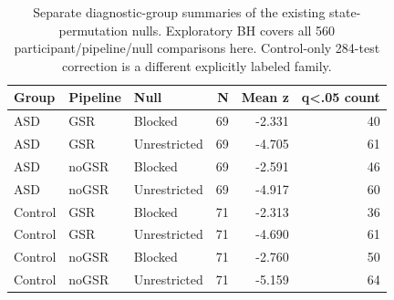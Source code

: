 \begin{table}[htbp]
\centering\small
\caption{Separate diagnostic-group summaries of the existing state-permutation nulls. Exploratory BH covers all 560 participant/pipeline/null comparisons here. Control-only 284-test correction is a different explicitly labeled family.}\label{tab:Sbothnull}
\begin{tabular}{lllrrr}
\toprule
Group & Pipeline & Null & N & Mean z & q<.05 count \\
\midrule
ASD & GSR & Blocked & 69 & -2.331 & 40 \\
ASD & GSR & Unrestricted & 69 & -4.705 & 61 \\
ASD & noGSR & Blocked & 69 & -2.591 & 46 \\
ASD & noGSR & Unrestricted & 69 & -4.917 & 60 \\
Control & GSR & Blocked & 71 & -2.313 & 36 \\
Control & GSR & Unrestricted & 71 & -4.690 & 61 \\
Control & noGSR & Blocked & 71 & -2.760 & 50 \\
Control & noGSR & Unrestricted & 71 & -5.159 & 64 \\
\bottomrule
\end{tabular}
\end{table}
